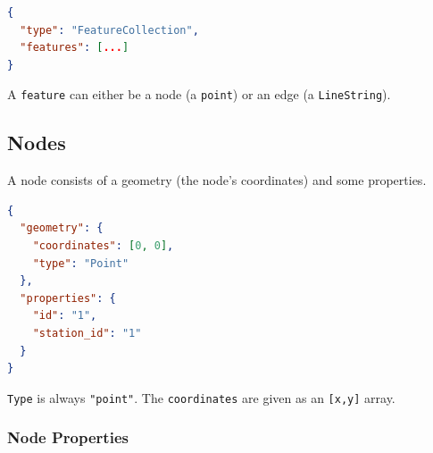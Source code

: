 \documentclass[10pt,a4paper]{article}
\begin{document}
\begin{lstlisting}[language=json,firstnumber=1]
{
  "type": "FeatureCollection",
  "features": [...]
}
\end{lstlisting}

A \texttt{feature} can either be a node (a \texttt{point}) or an edge (a \texttt{LineString}).

\subsection{Nodes}

A node consists of a geometry (the node's coordinates) and some properties.

\begin{lstlisting}[language=json,firstnumber=1]
{
  "geometry": {
	"coordinates": [0, 0],
	"type": "Point"
  },
  "properties": {
	"id": "1",
	"station_id": "1"
  }
}
\end{lstlisting}

\texttt{Type} is always \texttt{"point"}. The \texttt{coordinates} are given as an \texttt{[x,y]} array.

\subsubsection{Node Properties}
\end{document}
